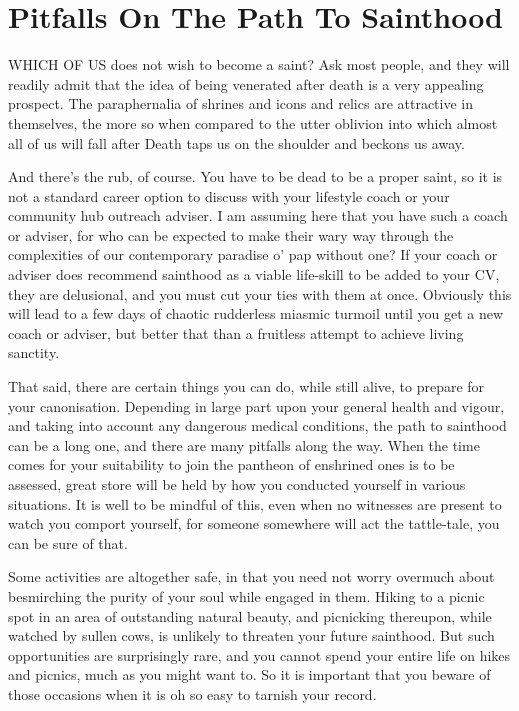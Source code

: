 \chapter{Pitfalls On The Path To Sainthood}

WHICH OF US does not wish to become a saint? Ask most people, and they will readily admit that the idea of being venerated after death is a very appealing prospect. The paraphernalia of shrines and icons and relics are attractive in themselves, the more so when compared to the utter oblivion into which almost all of us will fall after Death taps us on the shoulder and beckons us away.

And there's the rub, of course. You have to be dead to be a proper saint, so it is not a standard career option to discuss with your lifestyle coach or your community hub outreach adviser. I am assuming here that you have such a coach or adviser, for who can be expected to make their wary way through the complexities of our contemporary paradise o' pap without one? If your coach or adviser does recommend sainthood as a viable life-skill to be added to your CV, they are delusional, and you must cut your ties with them at once. Obviously this will lead to a few days of chaotic rudderless miasmic turmoil until you get a new coach or adviser, but better that than a fruitless attempt to achieve living sanctity.

That said, there are certain things you can do, while still alive, to prepare for your canonisation. Depending in large part upon your general health and vigour, and taking into account any dangerous medical conditions, the path to sainthood can be a long one, and there are many pitfalls along the way. When the time comes for your suitability to join the pantheon of enshrined ones is to be assessed, great store will be held by how you conducted yourself in various situations. It is well to be mindful of this, even when no witnesses are present to watch you comport yourself, for someone somewhere will act the tattle-tale, you can be sure of that.

Some activities are altogether safe, in that you need not worry overmuch about besmirching the purity of your soul while engaged in them. Hiking to a picnic spot in an area of outstanding natural beauty, and picnicking thereupon, while watched by sullen cows, is unlikely to threaten your future sainthood. But such opportunities are surprisingly rare, and you cannot spend your entire life on hikes and picnics, much as you might want to. So it is important that you beware of those occasions when it is oh so easy to tarnish your record.

